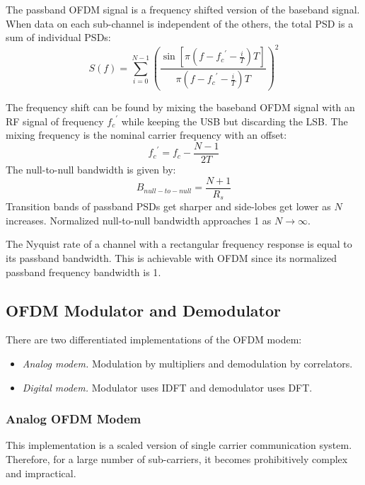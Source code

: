 The passband OFDM signal is a frequency shifted version of the baseband signal. When data on each sub-channel is independent of the others, the total \gls{PSD} is a sum of individual PSDs:
\begin{equation}
	S(f) = \sum_{i=0}^{N-1} \left( \frac{\sin \left[ \pi(f - {f_c}^\prime - \frac{i}{T})T \right]}{\pi(f - {f_c}^\prime - \frac{i}{T})T} \right)^2
\end{equation}
\begin{mathDef}
\end{mathDef}
The frequency shift can be found by mixing the baseband OFDM signal with an \gls{RF} signal of frequency \({f_c}^\prime\) while keeping the \gls{USB} but discarding the \gls{LSB}. The mixing frequency is the nominal carrier frequency with an offset:
\begin{equation}
	{f_c}^\prime = f_c - \frac{N-1}{2T}
\end{equation}
The null-to-null bandwidth is given by:
\begin{equation}
	B_{null-to-null} = \frac{N + 1}{R_s}
\end{equation}
Transition bands of passband PSDs get sharper and side-lobes get lower as \(N\) increases. Normalized null-to-null bandwidth approaches 1 as \(N\to\infty\)\cite{fuqin}.

The Nyquist rate of a channel with a rectangular frequency response is equal to its passband bandwidth. This is achievable with OFDM since its normalized passband frequency bandwidth is 1\cite{fuqin}.


\subsection{OFDM Modulator and Demodulator}
There are two differentiated implementations of the OFDM modem:
\begin{itemize}
	\item \emph{Analog modem.} Modulation by multipliers and demodulation by correlators.
	\item \emph{Digital modem.} Modulator uses \gls{IDFT} and demodulator uses \gls{DFT}.
\end{itemize}

\subsubsection{Analog OFDM Modem}
This implementation is a scaled version of single carrier communication system. Therefore, for a large number of sub-carriers, it becomes prohibitively complex and impractical. 
